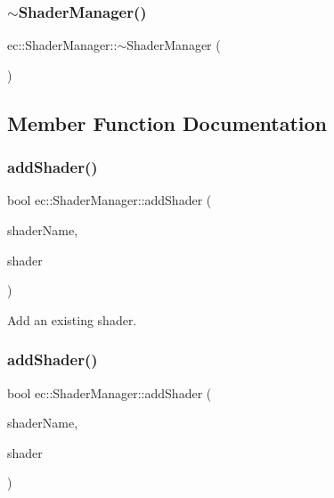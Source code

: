 \subsubsection{\texorpdfstring{$\sim$\+Shader\+Manager()}{~ShaderManager()}}
{\footnotesize\ttfamily ec\+::\+Shader\+Manager\+::$\sim$\+Shader\+Manager (\begin{DoxyParamCaption}{ }\end{DoxyParamCaption})\hspace{0.3cm}{\ttfamily [default]}}



\subsection{Member Function Documentation}
\mbox{\label{classec_1_1_shader_manager_a36bdf3a039a5a542ef4ea381ab5613ca}} 
\subsubsection{\texorpdfstring{add\+Shader()}{addShader()}\hspace{0.1cm}{\footnotesize\ttfamily [1/3]}}
{\footnotesize\ttfamily bool ec\+::\+Shader\+Manager\+::add\+Shader (\begin{DoxyParamCaption}\item[{const std\+::string \&}]{shader\+Name,  }\item[{\mbox{\hyperlink{classec_1_1_shader_manager_a55148a133c8ead8c61a0370dfba2d132}{Shader\+\_\+\+Ptr}}}]{shader }\end{DoxyParamCaption})}

Add an existing shader. \mbox{\label{classec_1_1_shader_manager_a720a9aca4f9dfe076a8f3f7cde58aedf}} 
\subsubsection{\texorpdfstring{add\+Shader()}{addShader()}\hspace{0.1cm}{\footnotesize\ttfamily [2/3]}}
{\footnotesize\ttfamily bool ec\+::\+Shader\+Manager\+::add\+Shader (\begin{DoxyParamCaption}\item[{const std\+::string \&}]{shader\+Name,  }\item[{\mbox{\hyperlink{classec_1_1_shader_manager_a43eaaa56325923c6cb6280f83f8ca08a}{Shader\+Timed\+\_\+\+Ptr}}}]{shader }\end{DoxyParamCaption})}

